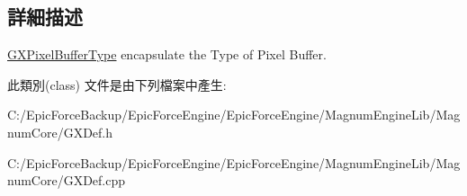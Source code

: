 \subsection{詳細描述}
\hyperlink{class_magnum_1_1_g_x_pixel_buffer_type}{G\+X\+Pixel\+Buffer\+Type} encapsulate the Type of Pixel Buffer. 

此類別(class) 文件是由下列檔案中產生\+:\begin{DoxyCompactItemize}
\item 
C\+:/\+Epic\+Force\+Backup/\+Epic\+Force\+Engine/\+Epic\+Force\+Engine/\+Magnum\+Engine\+Lib/\+Magnum\+Core/G\+X\+Def.\+h\item 
C\+:/\+Epic\+Force\+Backup/\+Epic\+Force\+Engine/\+Epic\+Force\+Engine/\+Magnum\+Engine\+Lib/\+Magnum\+Core/G\+X\+Def.\+cpp\end{DoxyCompactItemize}
